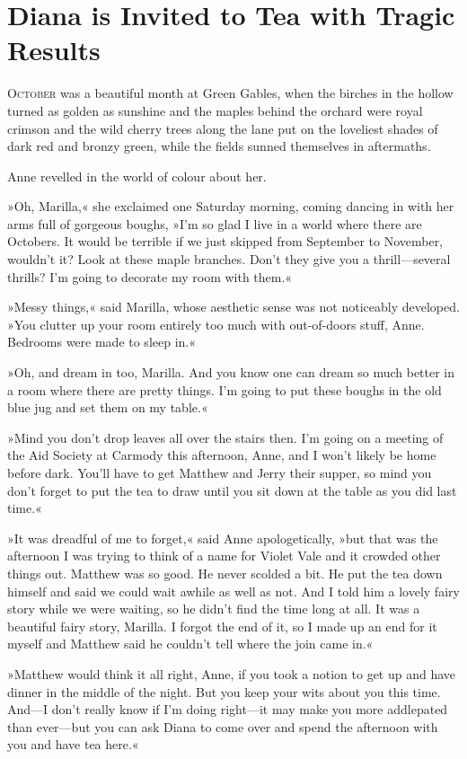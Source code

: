 \chapter{Diana is Invited to Tea with Tragic Results}

\lettrine[lines=4]{O}{ctober} was a beautiful month at Green Gables, when the birches in the hollow turned as golden as sunshine and the maples behind the orchard were royal crimson and the wild cherry trees along the lane put on the loveliest shades of dark red and bronzy green, while the fields sunned themselves in aftermaths.

Anne revelled in the world of colour about her.

»Oh, Marilla,« she exclaimed one Saturday morning, coming dancing in with her arms full of gorgeous boughs, »I’m so glad I live in a world where there are Octobers. It would be terrible if we just skipped from September to November, wouldn’t it? Look at these maple branches. Don’t they give you a thrill—several thrills? I’m going to decorate my room with them.«

»Messy things,« said Marilla, whose aesthetic sense was not noticeably developed. »You clutter up your room entirely too much with out-of-doors stuff, Anne. Bedrooms were made to sleep in.«

»Oh, and dream in too, Marilla. And you know one can dream so much better in a room where there are pretty things. I’m going to put these boughs in the old blue jug and set them on my table.«

»Mind you don’t drop leaves all over the stairs then. I’m going on a meeting of the Aid Society at Carmody this afternoon, Anne, and I won’t likely be home before dark. You’ll have to get Matthew and Jerry their supper, so mind you don’t forget to put the tea to draw until you sit down at the table as you did last time.«

»It was dreadful of me to forget,« said Anne apologetically, »but that was the afternoon I was trying to think of a name for Violet Vale and it crowded other things out. Matthew was so good. He never scolded a bit. He put the tea down himself and said we could wait awhile as well as not. And I told him a lovely fairy story while we were waiting, so he didn’t find the time long at all. It was a beautiful fairy story, Marilla. I forgot the end of it, so I made up an end for it myself and Matthew said he couldn’t tell where the join came in.«

»Matthew would think it all right, Anne, if you took a notion to get up and have dinner in the middle of the night. But you keep your wits about you this time. And—I don’t really know if I’m doing right—it may make you more addlepated than ever—but you can ask Diana to come over and spend the afternoon with you and have tea here.«

